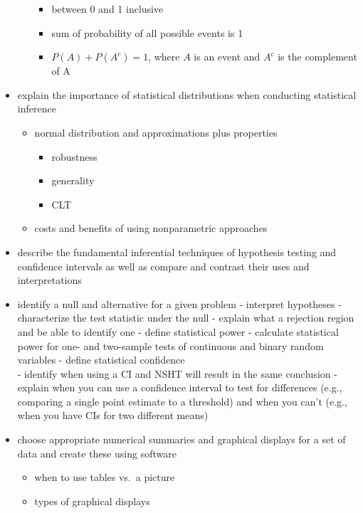 \documentclass[
]{book}
\providecommand{\tightlist}{%
  \setlength{\itemsep}{0pt}\setlength{\parskip}{0pt}}
\theoremstyle{definition}
\theoremstyle{definition}
\theoremstyle{definition}
\theoremstyle{remark}
\begin{document}
\begin{itemize}
\begin{itemize}
    \begin{itemize}
    \tightlist
    \item
      between 0 and 1 inclusive
    \item
      sum of probability of all possible events is 1
    \item
      \(P(A) + P(A^c) = 1\), where \(A\) is an event and \(A^c\) is the complement of A
    \end{itemize}
  \end{itemize}
\item
  explain the importance of statistical distributions when conducting statistical inference

  \begin{itemize}
  \tightlist
  \item
    normal distribution and approximations plus properties

    \begin{itemize}
    \tightlist
    \item
      robustness
    \item
      generality
    \item
      CLT
    \end{itemize}
  \item
    costs and benefits of using nonparametric approaches
  \end{itemize}
\item
  describe the fundamental inferential techniques of hypothesis testing and confidence intervals as well as compare and contrast their uses and interpretations
\item
  identify a null and alternative for a given problem
  - interpret hypotheses
  - characterize the test statistic under the null
  - explain what a rejection region and be able to identify one
  - define statistical power
  - calculate statistical power for one- and two-sample tests of continuous and binary random variables
  - define statistical confidence\\
  - identify when using a CI and NSHT will result in the same conclusion
  - explain when you can use a confidence interval to test for differences (e.g., comparing a single point estimate to a threshold) and when you can't (e.g., when you have CIs for two different means)
\item
  choose appropriate numerical summaries and graphical displays for a set of data and create these using software

  \begin{itemize}
  \tightlist
  \item
    when to use tables vs.~a picture
  \item
    types of graphical displays


\end{itemize}
\end{itemize}
\end{document}
